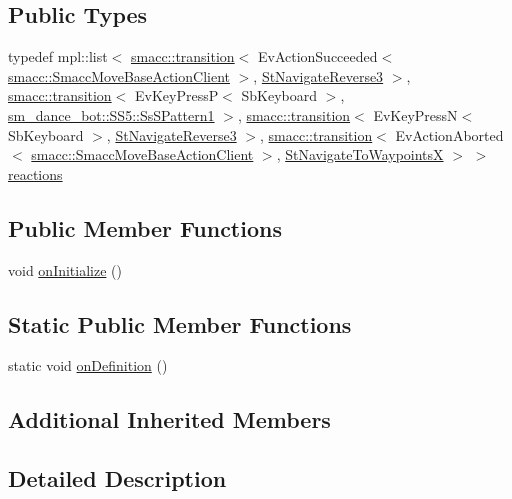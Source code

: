 \subsection*{Public Types}
\begin{DoxyCompactItemize}
\item 
typedef mpl\+::list$<$ \hyperlink{classsmacc_1_1transition}{smacc\+::transition}$<$ Ev\+Action\+Succeeded$<$ \hyperlink{classsmacc_1_1SmaccMoveBaseActionClient}{smacc\+::\+Smacc\+Move\+Base\+Action\+Client} $>$, \hyperlink{structStNavigateReverse3}{St\+Navigate\+Reverse3} $>$, \hyperlink{classsmacc_1_1transition}{smacc\+::transition}$<$ Ev\+Key\+PressP$<$ Sb\+Keyboard $>$, \hyperlink{structsm__dance__bot_1_1SS5_1_1SsSPattern1}{sm\+\_\+dance\+\_\+bot\+::\+S\+S5\+::\+Ss\+S\+Pattern1} $>$, \hyperlink{classsmacc_1_1transition}{smacc\+::transition}$<$ Ev\+Key\+PressN$<$ Sb\+Keyboard $>$, \hyperlink{structStNavigateReverse3}{St\+Navigate\+Reverse3} $>$, \hyperlink{classsmacc_1_1transition}{smacc\+::transition}$<$ Ev\+Action\+Aborted$<$ \hyperlink{classsmacc_1_1SmaccMoveBaseActionClient}{smacc\+::\+Smacc\+Move\+Base\+Action\+Client} $>$, \hyperlink{structStNavigateToWaypointsX}{St\+Navigate\+To\+WaypointsX} $>$ $>$ \hyperlink{structStRotateDegrees6_ab6204bce8375b36451571c974277c9c1}{reactions}
\end{DoxyCompactItemize}
\subsection*{Public Member Functions}
\begin{DoxyCompactItemize}
\item 
void \hyperlink{structStRotateDegrees6_ad83461ae95f2862d684609df5713d980}{on\+Initialize} ()
\end{DoxyCompactItemize}
\subsection*{Static Public Member Functions}
\begin{DoxyCompactItemize}
\item 
static void \hyperlink{structStRotateDegrees6_a939a41c05578dc4495d2ac05adf21cf0}{on\+Definition} ()
\end{DoxyCompactItemize}
\subsection*{Additional Inherited Members}


\subsection{Detailed Description}


